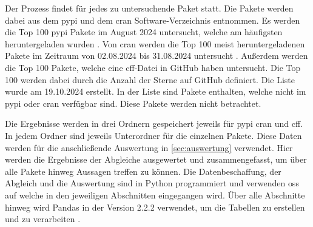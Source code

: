 Der Prozess findet für jedes zu untersuchende Paket statt.
Die Pakete werden dabei aus dem \gls{pypi} und dem \gls{cran} Software-Verzeichnis entnommen.
Es werden die Top 100 \gls{pypi} Pakete im August 2024 untersucht, welche am häufigsten heruntergeladen wurden \autocite{kemenade_hugovktop-pypi-packages_2024}.
Von \gls{cran} werden die Top 100 meist heruntergeladenen Pakete im Zeitraum von 02.08.2024 bis 31.08.2024 untersucht \autocite{csardi_r-hubcranlogsapp_2024}.
Außerdem werden die Top 100 Pakete, welche eine \gls{cff}-Datei in GitHub haben untersucht.
Die Top 100 werden dabei durch die Anzahl der Sterne auf GitHub definiert.
Die Liste wurde am 19.10.2024 erstellt.
In der Liste sind Pakete enthalten, welche nicht im \gls{pypi} oder \gls{cran} verfügbar sind.
Diese Pakete werden nicht betrachtet.

Die Ergebnisse werden in drei Ordnern gespeichert jeweils für \gls{pypi} \gls{cran} und \gls{cff}.
In jedem Ordner sind jeweils Unterordner für die einzelnen Pakete.
Diese Daten werden für die anschließende Auswertung in \autoref{sec:auswertung} verwendet.
Hier werden die Ergebnisse der Abgleiche ausgewertet und zusammengefasst, um über alle Pakete hinweg Aussagen treffen zu können.
Die Datenbeschaffung, der Abgleich und die Auswertung sind in Python programmiert und verwenden \gls{oss} auf welche in den jeweiligen Abschnitten eingegangen wird.
Über alle Abschnitte hinweg wird Pandas in der Version 2.2.2 verwendet, um die Tabellen zu erstellen und zu verarbeiten \autocite{the_pandas_development_team_pandas-devpandas_2024}.

